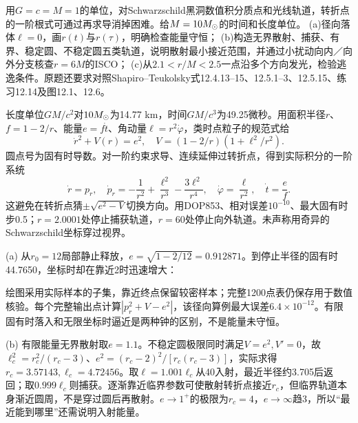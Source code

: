 \begin{exercise}
用$G=c=M=1$的单位，对Schwarzschild黑洞数值积分质点和光线轨道，转折点的一阶根式可通过再求导消掉困难。给$M=10M_{\odot}$的时间和长度单位。
(a)径向落体$\ell=0$，画$r(t)$与$r(\tau)$，明确检查能量守恒；
(b)构造无界散射、捕获、有界、稳定圆、不稳定圆五类轨道，说明散射最小接近范围，并通过小扰动向内／向外分支核查$r=6M$的ISCO；
(c)从$2.1<r/M<2.5$一点沿多个方向发光，检验逃逸条件。原题还要求对照Shapiro--Teukolsky式12.4.13--15、12.5.1--3、12.5.15、练习12.14及图12.1、12.6。
\end{exercise}
\begin{solution}
长度单位$GM/c^2$对$10M_{\odot}$为14.77 km，时间$GM/c^3$为49.25微秒。用面积半径$r$、$f=1-2/r$、能量$e=f\dot t$、角动量$\ell=r^2\dot\varphi$，类时点粒子的规范式给
\[
 \dot r^2+V(r)=e^2,\quad V=(1-2/r)(1+\ell^2/r^2).
\]
圆点号为固有时导数。对一阶约束求导、连续延伸过转折点，得到实际积分的一阶系统
\[
 \dot r=p_r,\quad\dot p_r=-\frac1{r^2}+\frac{\ell^2}{r^3}-\frac{3\ell^2}{r^4},
 \quad\dot\varphi=\frac\ell{r^2},\quad\dot t=\frac e f.
\]
这避免在转折点猜$\pm\sqrt{e^2-V}$切换方向。用DOP853、相对误差$10^{-10}$、最大固有时步0.5；$r=2.0001$处停止捕获轨道，$r=60$处停止向外轨道。未声称用奇异的Schwarzschild坐标穿过视界。

(a) 从$r_0=12$局部静止释放，$e=\sqrt{1-2/12}=0.912871$。到停止半径的固有时44.7650，坐标时却在靠近2时迅速增大：
\begin{center}
\hfill
{}
\end{center}
绘图采用实际样本的子集，靠近终点保留较密样本；完整1200点表仍保存用于数值核验。每个完整输出点计算$|p_r^2+V-e^2|$，该径向算例最大误差$6.4\times10^{-12}$。有限固有时落入和无限坐标时逼近是两种钟的区别，不是能量未守恒。

(b) 有限能量无界散射取$e=1.1$。不稳定圆极限同时满足$V=e^2,V'=0$，故$\ell_c^2=r_c^2/(r_c-3)$、$e^2=(r_c-2)^2/[r_c(r_c-3)]$，实际求得$r_c=3.57143,\ell_c=4.72456$。取$\ell=1.001\ell_c$从40入射，最近半径约3.705后返回；取$0.999\ell_c$则捕获。逐渐靠近临界参数可使散射转折点接近$r_c$，但临界轨道本身渐近圆周，不是穿过圆后再散射。$e\to1^+$的极限为$r_c=4$，$e\to\infty$趋3，所以“最近能到哪里”还需说明入射能量。


\end{solution}
